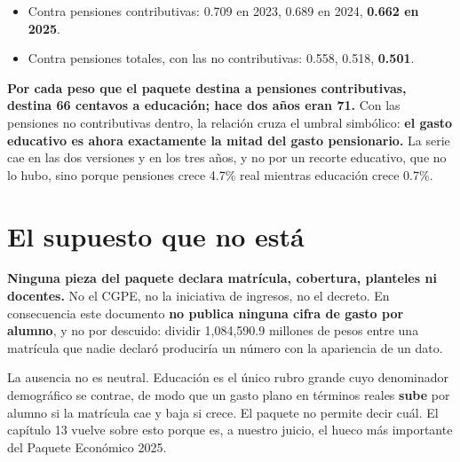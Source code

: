 \begin{itemize}
\item Contra pensiones contributivas: 0.709 en 2023, 0.689 en 2024, \textbf{0.662
en 2025}.
\item Contra pensiones totales, con las no contributivas: 0.558, 0.518,
\textbf{0.501}.
\end{itemize}

\textbf{Por cada peso que el paquete destina a pensiones contributivas, destina 66
centavos a educación; hace dos años eran 71.} Con las pensiones no contributivas
dentro, la relación cruza el umbral simbólico: \textbf{el gasto educativo es ahora
exactamente la mitad del gasto pensionario.} La serie cae en las dos versiones y
en los tres años, y no por un recorte educativo, que no lo hubo, sino porque
pensiones crece 4.7\% real mientras educación crece 0.7\%.

\section{El supuesto que no está}

\textbf{Ninguna pieza del paquete declara matrícula, cobertura, planteles ni
docentes.} No el CGPE, no la iniciativa de ingresos, no el decreto. En
consecuencia este documento \textbf{no publica ninguna cifra de gasto por
alumno}, y no por descuido: dividir 1,084,590.9 millones de pesos entre una
matrícula que nadie declaró produciría un número con la apariencia de un dato.

La ausencia no es neutral. Educación es el único rubro grande cuyo denominador
demográfico se contrae, de modo que un gasto plano en términos reales
\textbf{sube} por alumno si la matrícula cae y baja si crece. El paquete no
permite decir cuál. El capítulo 13 vuelve sobre esto porque es, a nuestro juicio,
el hueco más importante del Paquete Económico 2025.

\clearpage
